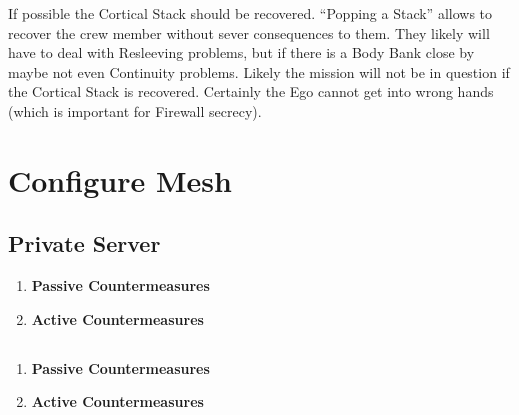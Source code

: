 If possible the \gls{Cortical Stack} should be recovered. “Popping a Stack” \citep[pg. 286]{ep2e_1.1_2019} allows to recover the crew member without sever consequences to them. They likely will have to deal with \gls{Resleeving} problems, but if there is a Body Bank close by maybe not even Continuity problems. Likely the mission will not be in question if the \gls{Cortical Stack} is recovered. Certainly the Ego cannot get into wrong hands (which is important for Firewall secrecy).




\section{Configure Mesh}


\subsection{Private Server}

\begin{enumerate}
    \item \textbf{Passive Countermeasures}
    \item \textbf{Active Countermeasures}
\end{enumerate}


\subsection{\egr{}}

\begin{enumerate}
    \item \textbf{Passive Countermeasures}
    \item \textbf{Active Countermeasures}
\end{enumerate}
